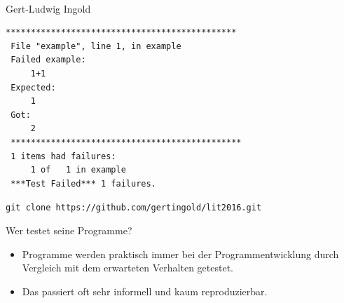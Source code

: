 \documentclass[t, utf8x, 10pt]{beamer}
\newcommand\pro{\textcolor{pro}{\faicon{smile-o}}}
\newcommand\contra{\textcolor{contra}{\faicon{frown-o}}}
\begin{document}
\begin{frame}[fragile]
 \vspace{1truecm}
 \begin{center}
  \\[0.3truecm]
  {\large Gert-Ludwig Ingold}

  \vspace{0.5truecm}
  \begin{minipage}{0.5\textwidth}
   \begin{tiny}
    \begin{lstlisting}[backgroundcolor=\color{black!10}
                       ,language={}]
 **********************************************
 File "example", line 1, in example
 Failed example:
     1+1
 Expected:
     1
 Got:
     2
 **********************************************
 1 items had failures:
     1 of   1 in example
 ***Test Failed*** 1 failures.
    \end{lstlisting}
   \end{tiny}
  \end{minipage}

  \vspace{1truecm}
  \texttt{\normalsize git clone https://github.com/gertingold/lit2016.git}
 \end{center}
\end{frame}


\begin{frame}[c]{Wer testet seine Programme?}
 \begin{itemize}
  \item[\pro]    Programme werden praktisch immer bei der Programmentwicklung
	         durch Vergleich mit dem erwarteten Verhalten getestet.
  \item[\contra] Das passiert oft sehr informell und kaum reproduzierbar.
 \end{itemize}

\end{frame}
\end{document}

